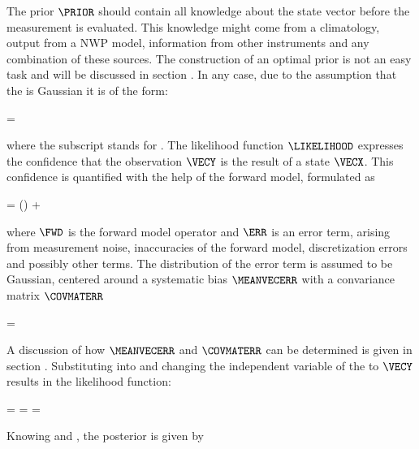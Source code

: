     The prior $\PRIOR$ should contain all knowledge about the state vector
    before the measurement is evaluated. This knowledge might come from
    a climatology, output from a NWP model, information from other instruments
    and any combination of these sources. The construction of an optimal prior
    is not an easy task and will be discussed in section
    . In any case, due to the assumption that the {\PDF}
    is Gaussian it is of the form:

    \startformula
        \PRIOR = \GAUSS{\VECX}{\MEANVECA}{\COVMATA} \EQCOMMA
    \stopformula

    where the subscript  stands for .  The likelihood
    function $\LIKELIHOOD$ expresses the confidence that the observation
    $\VECY$ is the result of a state $\VECX$. This confidence is quantified
    with the help of the forward model, formulated as

    \startformula
        \VECY = \FWD(\VECX) + \ERR \EQCOMMA
    \stopformula

    where $\FWD$ is the forward model operator and $\ERR$ is an error term,
    arising from measurement noise, inaccuracies of the forward model,
    discretization errors and possibly other terms. The distribution of the
    error term is assumed to be Gaussian, centered around a systematic bias
    $\MEANVECERR$ with a convariance matrix $\COVMATERR$

    \startformula
        \PROB{\ERR} = \GAUSS{\ERR}{\MEANVECERR}{\COVMATERR} \EQSTOP
    \stopformula

    A discussion of how $\MEANVECERR$ and $\COVMATERR$ can be determined is
    given in section . Substituting 
    into  and changing the independent variable of
    the {\PDF} to $\VECY$ results in the likelihood function:
    
    \placesubformula
    \startformula
    \startalign[n=3,align={right,middle,left}]
        \NC \PROB{\VECY - \FWD(\VECX)} = \NC
            \GAUSS{\VECY - \FWD(\VECX)}{\MEANVECERR}{\COVMATERR} \NC \NR
        \NC = \NC \GAUSS{\VECY}{\FWD(\VECX)+\MEANVECERR}{\COVMATERR} \NC
            = \LIKELIHOOD \EQSTOP {}
    \stopalign
    \stopformula

    Knowing  and , the
    posterior {\PDF} is given by

